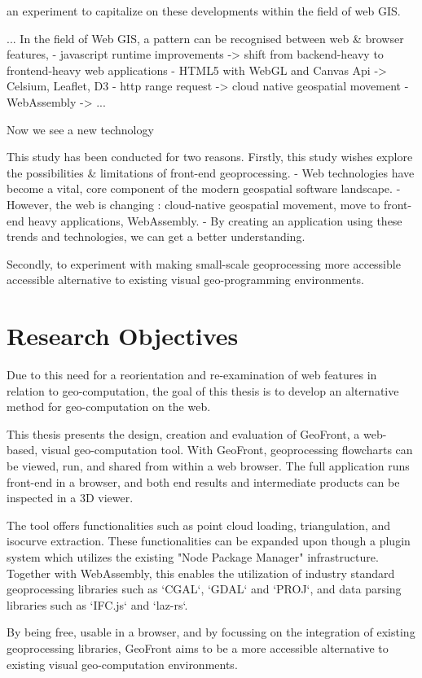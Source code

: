 an experiment to capitalize on these developments within the field of web GIS. 


...
In the field of Web GIS, a pattern can be recognised between web \& browser features,  
- javascript runtime improvements -> shift from backend-heavy to frontend-heavy web applications
- HTML5 with WebGL and Canvas Api -> Celsium, Leaflet, D3
- http range request -> cloud native geospatial movement 
- WebAssembly -> ...

Now we see a new technology 

This study has been conducted for two reasons.
Firstly, this study wishes explore the possibilities \& limitations of front-end geoprocessing.
  - Web technologies have become a vital, core component of the modern geospatial software landscape.
  - However, the web is changing : cloud-native geospatial movement, move to front-end heavy applications, WebAssembly. 
  - By creating an application using these trends and technologies, we can get a better understanding.

Secondly, to experiment with making small-scale geoprocessing more accessible
accessible alternative to existing visual geo-programming environments.

\section{Research Objectives}
Due to this need for a reorientation and re-examination of web features in relation to geo-computation, 
the goal of this thesis is to develop an alternative method for geo-computation on the web.

This thesis presents the design, creation and evaluation of GeoFront, a web-based, visual geo-computation tool. 
With GeoFront, geoprocessing flowcharts can be viewed, run, and shared from within a web browser.  
The full application runs front-end in a browser, and both end results and intermediate products can be inspected in a 3D viewer.

The tool offers functionalities such as point cloud loading, triangulation, and isocurve extraction.
These functionalities can be expanded upon though a plugin system which utilizes the existing "Node Package Manager" infrastructure.
Together with WebAssembly, this enables the utilization of industry standard geoprocessing libraries such as `CGAL`, `GDAL` and `PROJ`, and data parsing libraries such as `IFC.js` and `laz-rs`.

By being free, usable in a browser, and by focussing on the integration of existing geoprocessing libraries, GeoFront aims to be a more accessible alternative to existing visual geo-computation environments.

